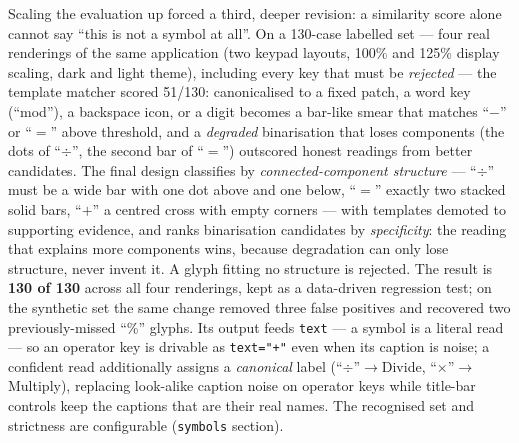 \documentclass[11pt,a4paper]{article}
\newcommand{\code}[1]{\texttt{#1}}
\begin{document}
Scaling the evaluation up forced a third, deeper revision: a similarity score
alone cannot say ``this is not a symbol at all''. On a 130-case labelled set ---
four real renderings of the same application (two keypad layouts, 100\% and 125\%
display scaling, dark and light theme), including every key that must be
\emph{rejected} --- the template matcher scored 51/130: canonicalised to a fixed
patch, a word key (``mod''), a backspace icon, or a digit becomes a bar-like
smear that matches ``$-$'' or ``$=$'' above threshold, and a \emph{degraded}
binarisation that loses components (the dots of ``$\div$'', the second bar of
``$=$'') outscored honest readings from better candidates. The final design
classifies by \emph{connected-component structure} --- ``$\div$'' must be a wide
bar with one dot above and one below, ``$=$'' exactly two stacked solid bars,
``$+$'' a centred cross with empty corners --- with templates demoted to
supporting evidence, and ranks binarisation candidates by \emph{specificity}:
the reading that explains more components wins, because degradation can only
lose structure, never invent it. A glyph fitting no structure is rejected. The
result is \textbf{130 of 130} across all four renderings, kept as a data-driven
regression test; on the synthetic set the same change removed three false
positives and recovered two previously-missed ``\%'' glyphs. Its output feeds
\code{text} --- a symbol is a literal read --- so an
operator key is drivable as \code{text="+"} even when its caption is noise; a
confident read additionally assigns a \emph{canonical} label
(``$\div$''$\rightarrow$Divide, ``$\times$''$\rightarrow$Multiply), replacing
look-alike caption noise on operator keys while title-bar controls keep the
captions that are their real names. The recognised set and strictness are
configurable (\code{symbols} section).
\end{document}
